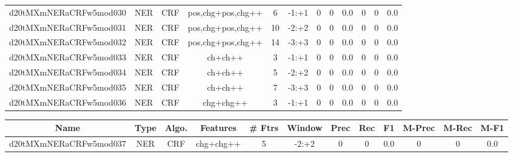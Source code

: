 \documentclass[a4paper]{article}
\begin{document}
\begin{landscape}
\begin{center}
\begin{tabular}{ |c|c|c|c|c|c|c|c|c|c|c|c|}
 
 	
 	\small{ d20tMXmNERaCRFw5mod030 } & \small{ NER} & \small{  CRF }  & pos,chg+pos,chg++  &  6 &  \small{  -1:+1 }  &  0 & 0 & 0.0  &  0 & 0 & 0.0 \\
 	

 
 	
 	\small{ d20tMXmNERaCRFw5mod031 } & \small{ NER} & \small{  CRF }  & pos,chg+pos,chg++  &  10 &  \small{  -2:+2 }  &  0 & 0 & 0.0  &  0 & 0 & 0.0 \\
 	

 
 	
 	\small{ d20tMXmNERaCRFw5mod032 } & \small{ NER} & \small{  CRF }  & pos,chg+pos,chg++  &  14 &  \small{  -3:+3 }  &  0 & 0 & 0.0  &  0 & 0 & 0.0 \\
 	

 
 	
 	\small{ d20tMXmNERaCRFw5mod033 } & \small{ NER} & \small{  CRF }  & ch+ch++  &  3 &  \small{  -1:+1 }  &  0 & 0 & 0.0  &  0 & 0 & 0.0 \\
 	

 
 	
 	\small{ d20tMXmNERaCRFw5mod034 } & \small{ NER} & \small{  CRF }  & ch+ch++  &  5 &  \small{  -2:+2 }  &  0 & 0 & 0.0  &  0 & 0 & 0.0 \\
 	

 
 	
 	\small{ d20tMXmNERaCRFw5mod035 } & \small{ NER} & \small{  CRF }  & ch+ch++  &  7 &  \small{  -3:+3 }  &  0 & 0 & 0.0  &  0 & 0 & 0.0 \\
 	

 
 	
 	\small{ d20tMXmNERaCRFw5mod036 } & \small{ NER} & \small{  CRF }  & chg+chg++  &  3 &  \small{  -1:+1 }  &  0 & 0 & 0.0  &  0 & 0 & 0.0 \\
 	
 \hline
\end{tabular}
\end{center}




\begin{center}
\begin{tabular}{ |c|c|c|c|c|c|c|c|c|c|c|c|} 
 \hline
 	Name & Type & Algo. & Features & \# Ftrs & Window & Prec & Rec & F1 & M-Prec & M-Rec & M-F1\\
 \hline

 	

 
 	
 	\small{ d20tMXmNERaCRFw5mod037 } & \small{ NER} & \small{  CRF }  & chg+chg++  &  5 &  \small{  -2:+2 }  &  0 & 0 & 0.0  &  0 & 0 & 0.0 \\
 	


\end{tabular}
\end{center}
\end{landscape}
\end{document}
